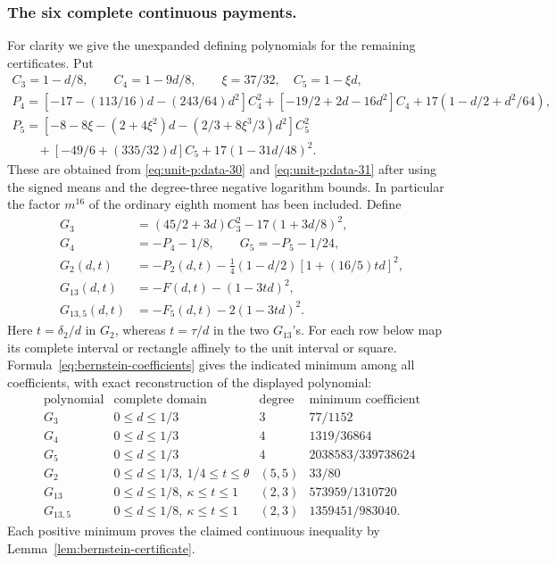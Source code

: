 \subsubsection{The six complete continuous payments.}\label{part:unit-p:certificates}
For clarity we give the unexpanded defining polynomials for the
remaining certificates. Put
\[
\begin{gathered}
 C_3=1-d/8,\qquad C_4=1-9d/8,\qquad
 \xi=37/32,\quad C_5=1-\xi d,\\
 P_4=[-17-(113/16)d-(243/64)d^2]C_4^2
             +[-19/2+2d-16d^2]C_4
             +17(1-d/2+d^2/64),\\
 P_5=[-8-8\xi-(2+4\xi^2)d-(2/3+8\xi^3/3)d^2]C_5^2\\
 \hspace{2em}+[-49/6+(335/32)d]C_5+17(1-31d/48)^2 .
\end{gathered}
\]
These are obtained from \eqref{eq:unit-p:data-30} and \eqref{eq:unit-p:data-31}
after using the signed means and the degree-three negative
logarithm bounds. In particular the factor \(m^{16}\) of the
ordinary eighth moment has been included.
Define
\begin{equation}\label{eq:unit-p:data-34}
\begin{aligned}
 G_3&=(45/2+3d)C_3^2-17(1+3d/8)^2,\\
 G_4&=-P_4-1/8,\qquad G_5=-P_5-1/24,\\
 G_2(d,t)&=-P_2(d,t)-\tfrac14(1-d/2)[1+(16/5)td]^2,\\
 G_{13}(d,t)&=-F(d,t)-(1-3td)^2,\\
 G_{13,5}(d,t)&=-F_5(d,t)-2(1-3td)^2 .
\end{aligned}
\end{equation}
Here \(t=\delta_2/d\) in \(G_2\), whereas \(t=\tau/d\) in
the two \(G_{13}\)'s. 
For each row below map its complete interval or rectangle
affinely to the unit interval or square.
Formula~\eqref{eq:bernstein-coefficients} gives the indicated
minimum among all coefficients, with exact reconstruction of the
displayed polynomial:
\begin{equation}\label{eq:unit-p:data-35}
\begin{array}{c|c|c|c}
 \text{polynomial}&\text{complete domain}&\text{degree}&
                                  \text{minimum coefficient}\\\hline
 G_3&0\le d\le1/3&3&77/1152\\
 G_4&0\le d\le1/3&4&1319/36864\\
 G_5&0\le d\le1/3&4&2038583/339738624\\
 G_2&0\le d\le1/3,\ 1/4\le t\le\theta&(5,5)&33/80\\
 G_{13}&0\le d\le1/8,\ \kappa\le t\le1&(2,3)&573959/1310720\\
 G_{13,5}&0\le d\le1/8,\ \kappa\le t\le1&(2,3)&1359451/983040 .
\end{array}
\end{equation}
Each positive minimum proves the claimed
continuous inequality by
Lemma~\ref{lem:bernstein-certificate}.

